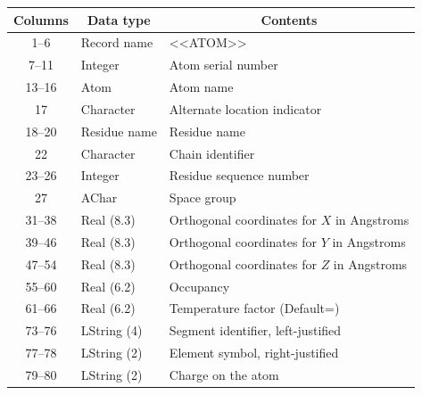 \begin{table}[h]\small %


\vspace*{-3pt}


\begin{center}




\vspace*{2ex}





\begin{tabular}{|c|l|l|}


\hline


Columns&\multicolumn{1}{c|}{Data type}&\multicolumn{1}{c|}{Contents}\\


\hline


1--6&Record name&<<ATOM>>\\


\hphantom{9}7--11&Integer&Atom serial number\\


13--16&Atom&Atom name\\


17&Character&Alternate location indicator\\


18--20&Residue name&Residue name\\


22&Character&Chain identifier\\


23--26&Integer&Residue sequence number\\


27&AChar&Space group\\


31--38&Real (8.3)&Orthogonal coordinates for $X$ in Angstroms\\


39--46&Real (8.3)&Orthogonal coordinates for $Y$ in Angstroms\\


47--54&Real (8.3)&Orthogonal coordinates for $Z$ in Angstroms\\


55--60&Real (6.2)&Occupancy\\


61--66&Real (6.2)&Temperature factor (Default\;=\;0.0)\\


73--76&LString (4)&Segment identifier, left-justified\\


77--78&LString (2)&Element symbol, right-justified\\


79--80&LString (2)&Charge on the atom\\


\hline


\end{tabular}


\end{center}


\vspace*{-9pt}


\end{table}
